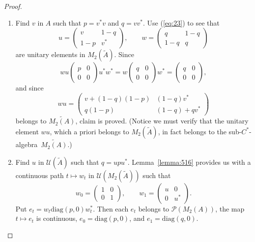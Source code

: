 \documentclass{book}
\def\cstar{\(C^*\)-algebra}
\begin{document}
\begin{proof}
  \begin{enumerate}
    \item Find \(v\) in \(A\) such that \(p=v^*v\) and \(q=vv^*\). Use (\ref{eq:23}) to see that
    \[
      u=\begin{pmatrix}
        v&1-q\\1-p&v^*
      \end{pmatrix},\qquad
      w=\begin{pmatrix}
        q&1-q\\1-q&q
      \end{pmatrix}
    \]
    are unitary elements in \(M_2(\widetilde{A})\). Since
    \[
      wu\begin{pmatrix}
        p&0\\0&0
      \end{pmatrix}
      u^* w^*=w\begin{pmatrix}
        q&0\\0&0
      \end{pmatrix}
      w^*=\begin{pmatrix}
        q&0\\0&0
      \end{pmatrix},
    \]
    and since 
    \[
      wu=\begin{pmatrix}
        v+(1-q)(1-p)&(1-q)v^*\\q(1-p)&(1-q)+qv^*
      \end{pmatrix}
    \]
    belongs to \(\widetilde{M_2(A)}\), claim is proved. (Notice we must verify that the unitary element
    \(wu\), which a priori belongs to \(M_2(\widetilde{A})\), in fact belongs to the sub-\cstar\ \(\widetilde{M_2(A)}\).)
    \item Find \(u\) in \(\mathcal{U}(\widetilde{A})\) such that \(q=up u^*\). Lemma~\ref{lemma:516} provides us with a continuous path
    \(t\mapsto w_t\) in \(\mathcal{U}(M_2(\widetilde{A}))\) such that
    \[
      w_0=\begin{pmatrix}
        1&0\\0&1
      \end{pmatrix},\qquad
      w_1=\begin{pmatrix}
        u&0\\0&u^*
      \end{pmatrix}.
    \]
    Put \(e_t=w_t \text{diag}(p,0)w_t^*\). Then each \(e_t\) belongs to \(\mathcal{P}(M_2(A))\), the map \(t\mapsto e_t\) is continuous,
    \(e_0=\text{diag}(p,0)\), and \(e_1=\text{diag}(q,0)\).
  \end{enumerate}
\end{proof}
\end{document}
